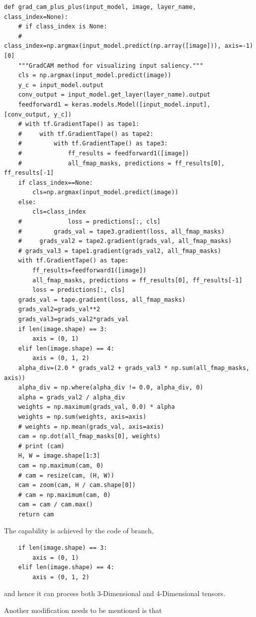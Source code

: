 \documentclass[conference]{IEEEtran}
\begin{document}
\begin{lstlisting}
def grad_cam_plus_plus(input_model, image, layer_name, class_index=None):
    # if class_index is None:
    #     class_index=np.argmax(input_model.predict(np.array([image])), axis=-1)[0]
    """GradCAM method for visualizing input saliency."""
    cls = np.argmax(input_model.predict(image))
    y_c = input_model.output
    conv_output = input_model.get_layer(layer_name).output
    feedforward1 = keras.models.Model([input_model.input], [conv_output, y_c])
    # with tf.GradientTape() as tape1:
    #     with tf.GradientTape() as tape2:
    #         with tf.GradientTape() as tape3:
    #             ff_results = feedforward1([image])
    #             all_fmap_masks, predictions = ff_results[0], ff_results[-1]
    if class_index==None:
        cls=np.argmax(input_model.predict(image))
    else:
        cls=class_index
    #             loss = predictions[:, cls]
    #         grads_val = tape3.gradient(loss, all_fmap_masks)
    #     grads_val2 = tape2.gradient(grads_val, all_fmap_masks)
    # grads_val3 = tape1.gradient(grads_val2, all_fmap_masks)
    with tf.GradientTape() as tape:
        ff_results=feedforward1([image])
        all_fmap_masks, predictions = ff_results[0], ff_results[-1]
        loss = predictions[:, cls]
    grads_val = tape.gradient(loss, all_fmap_masks)
    grads_val2=grads_val**2
    grads_val3=grads_val2*grads_val
    if len(image.shape) == 3:
        axis = (0, 1)
    elif len(image.shape) == 4:
        axis = (0, 1, 2)
    alpha_div=(2.0 * grads_val2 + grads_val3 * np.sum(all_fmap_masks, axis))
    alpha_div = np.where(alpha_div != 0.0, alpha_div, 0)
    alpha = grads_val2 / alpha_div
    weights = np.maximum(grads_val, 0.0) * alpha
    weights = np.sum(weights, axis=axis)
    # weights = np.mean(grads_val, axis=axis)
    cam = np.dot(all_fmap_masks[0], weights)
    # print (cam)
    H, W = image.shape[1:3]
    cam = np.maximum(cam, 0)
    # cam = resize(cam, (H, W))
    cam = zoom(cam, H / cam.shape[0])
    # cam = np.maximum(cam, 0)
    cam = cam / cam.max()
    return cam
\end{lstlisting}

The capability is achieved by the code of branch,
\begin{lstlisting}
    if len(image.shape) == 3:
        axis = (0, 1)
    elif len(image.shape) == 4:
        axis = (0, 1, 2)
\end{lstlisting}
and hence it can process both 3-Dimensional and 4-Dimensional tensors.

Another modification needs to be mentioned is that
\end{document}
